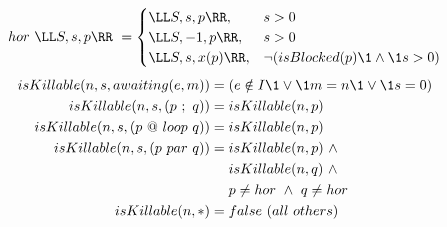 %
\[
hor~\LL S, s, p \RR~ =
\begin{cases}
    \LL S,  s, p    \RR, &        s>0     \\
    \LL S, -1, p    \RR, &        s>0     \\
    \LL S,  s, x(p) \RR, & \neg ( isBlocked(p) \1\wedge\1 s>0 )
\end{cases}
\]
%
{\small
\begin{align*}
  isKillable(n,s, awaiting(e,m)) &= (e \notin I \1\vee\1 m = n \1\vee\1 s=0)\\
  isKillable(n,s, (p~;~q))       &= isKillable(n,p)             \\
  isKillable(n,s, (p~@~loop~q))  &= isKillable(n,p)             \\
  isKillable(n,s, (p~par~q))     &= isKillable(n,p)~\wedge \\
                                     &~~~~isKillable(n,q)~\wedge \\
                                     &~~~~p \neq hor~\wedge~q \neq hor \\
  isKillable(n, *)             &= false~(all~others)
\end{align*}
}
%

